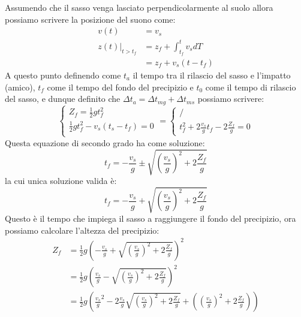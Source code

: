         Assumendo che il sasso venga lasciato perpendicolarmente al suolo allora possiamo scrivere la posizione del suono come:
        $$
            \begin{aligned}
                v(t)&=v_s\\
                z(t)|_{t>t_f}&=z_f + \int_{t_f}^t v_s dT\\
                &= z_f + v_s(t-t_f)
            \end{aligned}
        $$
        A questo punto definendo come $t_a$ il tempo tra il rilascio del sasso e l'impatto (amico), $t_f$ come il tempo del fondo del precipizio e $t_0$ come il tempo di rilascio del sasso, e dunque definito che $\Delta t_a = \Delta t_{mg} + \Delta t_{ms} $ possiamo scrivere:
        $$
            \begin{cases}
                Z_f = \frac{1}{2}gt_f^2\\
                \frac{1}{2}gt_f^2 - v_s(t_s-t_f) = 0\\
            \end{cases} = 
            \begin{cases}
                /\\
                t_f^2+2\frac{v_s}{g}t_f - 2\frac{Z_f}{g} = 0
            \end{cases}
        $$
        Questa equazione di secondo grado ha come soluzione:
        $$
            t_f = -\frac{v_s}{g} \pm \sqrt{\left(\frac{v_s}{g}\right)^2 + 2\frac{Z_f}{g}}
        $$
        la cui unica soluzione valida è:
        $$
            t_f = -\frac{v_s}{g} + \sqrt{\left(\frac{v_s}{g}\right)^2 + 2\frac{Z_f}{g}}
        $$
        Questo è il tempo che impiega il sasso a raggiungere il fondo del precipizio, ora possiamo calcolare l'altezza del precipizio:
        $$
            \begin{aligned}
                Z_f &= \frac{1}{2}g\left(-\frac{v_s}{g} + \sqrt{\left(\frac{v_s}{g}\right)^2 + 2\frac{Z_f}{g}}\right)^2\\
                &= \frac{1}{2}g\left(\frac{v_s}{g} - \sqrt{\left(\frac{v_s}{g}\right)^2 + 2\frac{Z_f}{g}}\right)^2\\
                &= \frac{1}{2}g\left({\frac{v_s}{g}}^2 - 2\frac{v_s}{g}\sqrt{\left(\frac{v_s}{g}\right)^2 + 2\frac{Z_f}{g}} + \left(\left(\frac{v_s}{g}\right)^2 + 2\frac{Z_f}{g}\right)\right) \\
            \end{aligned}
        $$
